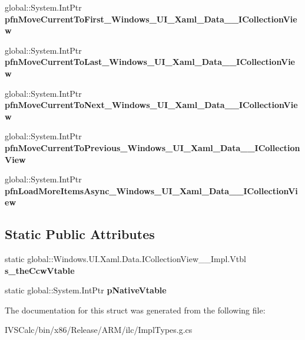 \begin{DoxyCompactItemize}
global\+::\+System.\+Int\+Ptr {\bfseries pfn\+Move\+Current\+To\+First\+\_\+\+Windows\+\_\+\+U\+I\+\_\+\+Xaml\+\_\+\+Data\+\_\+\+\_\+\+I\+Collection\+View}
\item 
\mbox{\label{struct_windows_1_1_u_i_1_1_xaml_1_1_data_1_1_i_collection_view_____impl_1_1_vtbl_aa07304ff67f7c5f3f3e827dabab2629b}} 
global\+::\+System.\+Int\+Ptr {\bfseries pfn\+Move\+Current\+To\+Last\+\_\+\+Windows\+\_\+\+U\+I\+\_\+\+Xaml\+\_\+\+Data\+\_\+\+\_\+\+I\+Collection\+View}
\item 
\mbox{\label{struct_windows_1_1_u_i_1_1_xaml_1_1_data_1_1_i_collection_view_____impl_1_1_vtbl_afd4e2da5765c0fc2c9793ad144b05d5e}} 
global\+::\+System.\+Int\+Ptr {\bfseries pfn\+Move\+Current\+To\+Next\+\_\+\+Windows\+\_\+\+U\+I\+\_\+\+Xaml\+\_\+\+Data\+\_\+\+\_\+\+I\+Collection\+View}
\item 
\mbox{\label{struct_windows_1_1_u_i_1_1_xaml_1_1_data_1_1_i_collection_view_____impl_1_1_vtbl_afb9b0a73a9cf80bc82c5b10406faa27a}} 
global\+::\+System.\+Int\+Ptr {\bfseries pfn\+Move\+Current\+To\+Previous\+\_\+\+Windows\+\_\+\+U\+I\+\_\+\+Xaml\+\_\+\+Data\+\_\+\+\_\+\+I\+Collection\+View}
\item 
\mbox{\label{struct_windows_1_1_u_i_1_1_xaml_1_1_data_1_1_i_collection_view_____impl_1_1_vtbl_a1a42da3ce2036227642d4f7fdd48bd67}} 
global\+::\+System.\+Int\+Ptr {\bfseries pfn\+Load\+More\+Items\+Async\+\_\+\+Windows\+\_\+\+U\+I\+\_\+\+Xaml\+\_\+\+Data\+\_\+\+\_\+\+I\+Collection\+View}
\end{DoxyCompactItemize}
\subsection*{Static Public Attributes}
\begin{DoxyCompactItemize}
\item 
\mbox{\label{struct_windows_1_1_u_i_1_1_xaml_1_1_data_1_1_i_collection_view_____impl_1_1_vtbl_afa64cc1b445f5f9977c2e41cc2e228a6}} 
static global\+::\+Windows.\+U\+I.\+Xaml.\+Data.\+I\+Collection\+View\+\_\+\+\_\+\+Impl.\+Vtbl {\bfseries s\+\_\+the\+Ccw\+Vtable}
\item 
\mbox{\label{struct_windows_1_1_u_i_1_1_xaml_1_1_data_1_1_i_collection_view_____impl_1_1_vtbl_a47b50b4506589a8ba36ab1974ceee96e}} 
static global\+::\+System.\+Int\+Ptr {\bfseries p\+Native\+Vtable}
\end{DoxyCompactItemize}


The documentation for this struct was generated from the following file\+:\begin{DoxyCompactItemize}
\item 
I\+V\+S\+Calc/bin/x86/\+Release/\+A\+R\+M/ilc/Impl\+Types.\+g.\+cs\end{DoxyCompactItemize}
